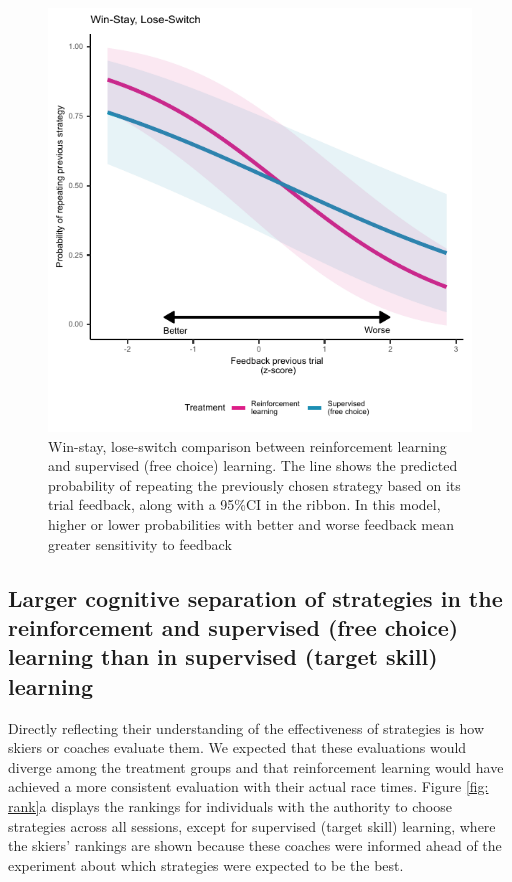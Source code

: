 \documentclass{article}
\begin{document}
\begin{figure}[H]
\centering
\includegraphics{figures/figure_winstaylooseshift.pdf}
\caption{Win-stay, lose-switch comparison between reinforcement learning and supervised (free choice) learning. The line shows the predicted probability of repeating the previously chosen strategy based on its trial feedback, along with a 95\%CI in the ribbon. In this model, higher or lower probabilities with better and worse feedback mean greater sensitivity to feedback}\label{fig: choice_wsls}
\end{figure}



\subsection{Larger cognitive separation of strategies in the reinforcement and supervised (free choice) learning than in supervised (target skill) learning}\label{subsec4}
Directly reflecting their understanding of the effectiveness of strategies is how skiers or coaches evaluate them. We expected that these evaluations would diverge among the treatment groups and that reinforcement learning would have achieved a more consistent evaluation with their actual race times. Figure \ref{fig: rank}a displays the rankings for individuals with the authority  to choose strategies across all sessions, except for supervised (target skill) learning, where the skiers' rankings are shown because these coaches were informed ahead of the experiment about which strategies were expected to be the best. 
\end{document}
